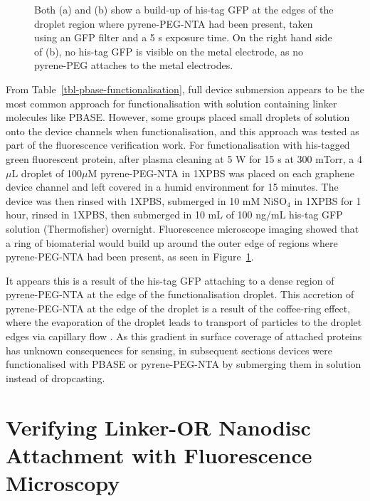 \documentclass[
  a4paper,
]{scrbook}
\begin{document}
\begin{figure}
\begin{minipage}[t]{0.47\linewidth}
{{}

}

\subcaption{\label{fig-GFP-coffee-ring-2}}
\end{minipage}%

\caption{\label{fig-GFP-coffee-ring}Both (a) and (b) show a build-up of
his-tag GFP at the edges of the droplet region where pyrene-PEG-NTA had
been present, taken using an GFP filter and a 5 s exposure time. On the
right hand side of (b), no his-tag GFP is visible on the metal
electrode, as no pyrene-PEG attaches to the metal electrodes.}

\end{figure}

From Table~\ref{tbl-pbase-functionalisation}, full device submersion
appears to be the most common approach for functionalisation with
solution containing linker molecules like PBASE. However, some groups
placed small droplets of solution onto the device channels when
functionalisation, and this approach was tested as part of the
fluorescence verification work. For functionalisation with his-tagged
green fluorescent protein, after plasma cleaning at 5 W for 15 s at 300
mTorr, a 4 \(\mu\)L droplet of 100\(\mu\)M pyrene-PEG-NTA in 1XPBS was
placed on each graphene device channel and left covered in a humid
environment for 15 minutes. The device was then rinsed with 1XPBS,
submerged in 10 mM NiSO\(_4\) in 1XPBS for 1 hour, rinsed in 1XPBS, then
submerged in 10 mL of 100 ng/mL his-tag GFP solution (Thermofisher)
overnight. Fluorescence microscope imaging showed that a ring of
biomaterial would build up around the outer edge of regions where
pyrene-PEG-NTA had been present, as seen in
Figure~\ref{fig-GFP-coffee-ring}.

It appears this is a result of the his-tag GFP attaching to a dense
region of pyrene-PEG-NTA at the edge of the functionalisation droplet.
This accretion of pyrene-PEG-NTA at the edge of the droplet is a result
of the coffee-ring effect, where the evaporation of the droplet leads to
transport of particles to the droplet edges via capillary flow
\autocite{Deegan1997,Shimobayashi2018}. As this gradient in surface
coverage of attached proteins has unknown consequences for sensing, in
subsequent sections devices were functionalised with PBASE or
pyrene-PEG-NTA by submerging them in solution instead of dropcasting.

\hypertarget{sec-linker-receptor-attachment}{%
\section{Verifying Linker-OR Nanodisc Attachment with Fluorescence
Microscopy}\label{sec-linker-receptor-attachment}}
\end{document}
